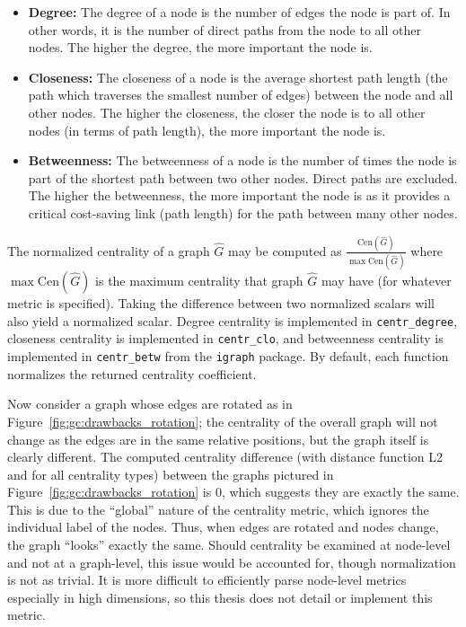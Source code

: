 \tablespacing
\begin{itemize}
	\item \textbf{Degree:} 
	The degree of a node is the number of edges the node 
	is part of. In other words, it is the number of direct paths from the node 
	to all other nodes. The higher the degree, the more important the node 
	is.
	\item \textbf{Closeness:} 
	The closeness of a node is the average 
	shortest path length (the path which traverses the smallest number of 
	edges) between the node and all other nodes. The higher the closeness, 
	the closer the node is to all other nodes (in terms of path length), the 
	more important the node is.
	\item \textbf{Betweenness:} 
	The betweenness of a node is the number of 
	times the node is part of the shortest path between two other nodes. Direct 
	paths are excluded. The higher the betweenness, the more important the node 
	is as it provides a critical cost-saving link (path length) for the path 
	between many other nodes. 
\end{itemize}
\bodyspacing

The normalized centrality of a graph $\hat{G}$ may be computed as 	
$\frac{\text{Cen}(\hat{G})}{\max \text{Cen}(\hat{G})}$ where 
$\max \text{Cen}(\hat{G})$ is the 
maximum centrality that graph $\hat{G}$ may have (for whatever metric is 
specified). Taking the difference between two normalized scalars will also 
yield a normalized scalar.
Degree centrality is implemented in \texttt{centr\_degree}, 
closeness centrality is implemented in \texttt{centr\_clo}, and betweenness 
centrality is implemented in \texttt{centr\_betw} from the \texttt{igraph} 
package. By default, each function normalizes the returned centrality 
coefficient.

Now consider a graph whose edges are rotated as in 
Figure~\ref{fig:gc:drawbacks_rotation}; the centrality of the overall graph 
will not change as the edges are in the same relative positions, but the graph 
itself is clearly different. The computed centrality difference (with distance 
function L2 and for all centrality types) between the graphs pictured in 
Figure~\ref{fig:gc:drawbacks_rotation} is 0, which suggests they are exactly 
the same. This is due to the ``global'' nature of the centrality metric, which 
ignores the individual label of the nodes. Thus, when edges are rotated and 
nodes change, the graph ``looks'' exactly the same.
Should centrality be examined at node-level and not at a graph-level, 
this issue would be accounted for, though normalization is not as trivial. It 
is more difficult to efficiently parse node-level metrics 
especially in high dimensions, so this thesis does not detail or implement this 
metric.

